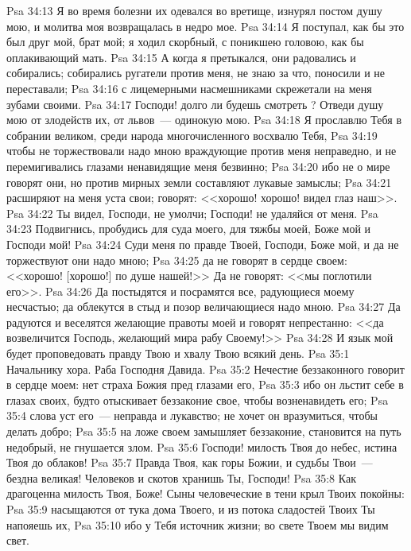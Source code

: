 \vs Psa 34:13 Я во время болезни их одевался во вретище, изнурял постом душу мою, и молитва моя возвращалась в недро мое.
\vs Psa 34:14 Я поступал, как бы это был друг мой, брат мой; я ходил скорбный, с поникшею головою, как бы оплакивающий мать.
\vs Psa 34:15 А когда я претыкался, они радовались и собирались; собирались ругатели против меня, не знаю за что, поносили и не переставали;
\vs Psa 34:16 с лицемерными насмешниками скрежетали на меня зубами своими.
\vs Psa 34:17 Господи! долго ли будешь смотреть ? Отведи душу мою от злодейств их, от львов~--- одинокую мою.
\vs Psa 34:18 Я прославлю Тебя в собрании великом, среди народа многочисленного восхвалю Тебя,
\vs Psa 34:19 чтобы не торжествовали надо мною враждующие против меня неправедно, и не перемигивались глазами ненавидящие меня безвинно;
\vs Psa 34:20 ибо не о мире говорят они, но против мирных земли составляют лукавые замыслы;
\vs Psa 34:21 расширяют на меня уста свои; говорят: <<хорошо! хорошо! видел глаз наш>>.
\vs Psa 34:22 Ты видел, Господи, не умолчи; Господи! не удаляйся от меня.
\vs Psa 34:23 Подвигнись, пробудись для суда моего, для тяжбы моей, Боже мой и Господи мой!
\vs Psa 34:24 Суди меня по правде Твоей, Господи, Боже мой, и да не торжествуют они надо мною;
\vs Psa 34:25 да не говорят в сердце своем: <<хорошо! [хорошо!] по душе нашей!>> Да не говорят: <<мы поглотили его>>.
\vs Psa 34:26 Да постыдятся и посрамятся все, радующиеся моему несчастью; да облекутся в стыд и позор величающиеся надо мною.
\vs Psa 34:27 Да радуются и веселятся желающие правоты моей и говорят непрестанно: <<да возвеличится Господь, желающий мира рабу Своему!>>
\vs Psa 34:28 И язык мой будет проповедовать правду Твою и хвалу Твою всякий день.
\vs Psa 35:1 Начальнику хора. Раба Господня Давида.
\rsbpar\vs Psa 35:2 Нечестие беззаконного говорит в сердце моем: нет страха Божия пред глазами его,
\vs Psa 35:3 ибо он льстит себе в глазах своих, будто отыскивает беззаконие свое, чтобы возненавидеть его;
\vs Psa 35:4 слова уст его~--- неправда и лукавство; не хочет он вразумиться, чтобы делать добро;
\vs Psa 35:5 на ложе своем замышляет беззаконие, становится на путь недобрый, не гнушается злом.
\vs Psa 35:6 Господи! милость Твоя до небес, истина Твоя до облаков!
\vs Psa 35:7 Правда Твоя, как горы Божии, и судьбы Твои~--- бездна великая! Человеков и скотов хранишь Ты, Господи!
\vs Psa 35:8 Как драгоценна милость Твоя, Боже! Сыны человеческие в тени крыл Твоих покойны:
\vs Psa 35:9 насыщаются от тука дома Твоего, и из потока сладостей Твоих Ты напояешь их,
\vs Psa 35:10 ибо у Тебя источник жизни; во свете Твоем мы видим свет.
